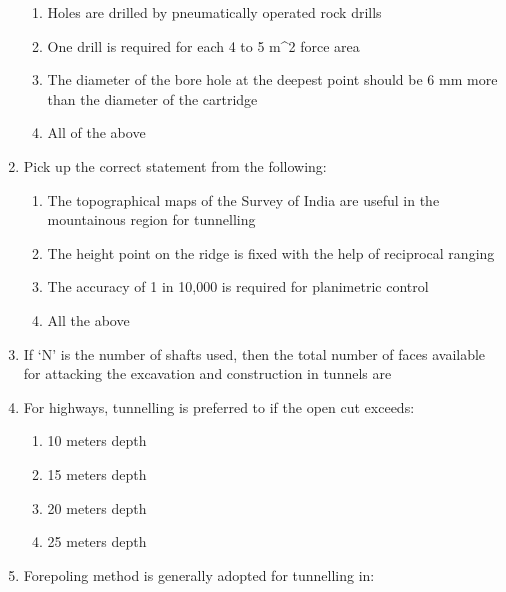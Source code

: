 \documentclass[11pt,a4paper]{article}
\begin{document}
\begin{enumerate}
\begin{enumerate}[label=\Alph*.]
\item{Holes are drilled by pneumatically operated rock drills}
\item{One drill is required for each 4 to 5 m\^{}2 force area}
\item{The diameter of the bore hole at the deepest point should be 6 mm more than the diameter of the cartridge}
\item{All of the above}
\end{enumerate}
\item{Pick up the correct statement from the following:}
\begin{enumerate}[label=\Alph*.]
\item{The topographical maps of the Survey of India are useful in the mountainous region for tunnelling}
\item{The height point on the ridge is fixed with the help of reciprocal ranging}
\item{The accuracy of 1 in 10,000 is required for planimetric control}
\item{All the above}
\end{enumerate}
\item{If `N' is the number of shafts used, then the total number of faces available for attacking the excavation and construction in tunnels are
}
\\
\item{For highways, tunnelling is preferred to if the open cut exceeds:}
\begin{enumerate}[label=\Alph*.]
\item{10 meters depth}
\item{15 meters depth}
\item{20 meters depth}
\item{25 meters depth}
\end{enumerate}
\item{Forepoling method is generally adopted for tunnelling in:}
\\
\end{enumerate}
\end{document}
